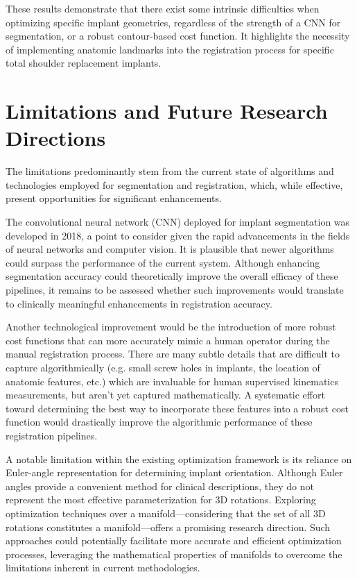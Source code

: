 These results demonstrate that there exist some intrinsic difficulties when optimizing specific implant geometries, regardless of the strength of a CNN for segmentation, or a robust contour-based cost function.
It highlights the necessity of implementing anatomic landmarks into the registration process for specific total shoulder replacement implants.


\section{Limitations and Future Research Directions}
The limitations predominantly stem from the current state of algorithms and technologies employed for segmentation and registration, which, while effective, present opportunities for significant enhancements.

The convolutional neural network (CNN) deployed for implant segmentation was developed in 2018, a point to consider given the rapid advancements in the fields of neural networks and computer vision.
It is plausible that newer algorithms could surpass the performance of the current system.
Although enhancing segmentation accuracy could theoretically improve the overall efficacy of these pipelines, it remains to be assessed whether such improvements would translate to clinically meaningful enhancements in registration accuracy.

Another technological improvement would be the introduction of more robust cost functions that can more accurately mimic a human operator during the manual registration process.
There are many subtle details that are difficult to capture algorithmically (e.g. small screw holes in implants, the location of anatomic features, etc.) which are invaluable for human supervised kinematics measurements, but aren't yet captured mathematically.
A systematic effort toward determining the best way to incorporate these features into a robust cost function would drastically improve the algorithmic performance of these registration pipelines.

A notable limitation within the existing optimization framework is its reliance on Euler-angle representation for determining implant orientation.
Although Euler angles provide a convenient method for clinical descriptions, they do not represent the most effective parameterization for 3D rotations.
Exploring optimization techniques over a manifold—considering that the set of all 3D rotations constitutes a manifold—offers a promising research direction.
Such approaches could potentially facilitate more accurate and efficient optimization processes, leveraging the mathematical properties of manifolds to overcome the limitations inherent in current methodologies.

